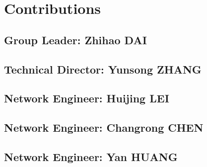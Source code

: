 \chapter{Contributions}
\label{chap:contributions}

\section{Group Leader: Zhihao DAI}

\section{Technical Director: Yunsong ZHANG}

\section{Network Engineer: Huijing LEI}

\section{Network Engineer: Changrong CHEN}

\section{Network Engineer: Yan HUANG}

